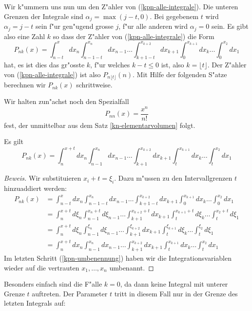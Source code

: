 Wir k"ummern uns nun um den Z"ahler von (\ref{kpn-alle-integrale}).
Die unteren Grenzen der
Integrale sind $\alpha_j=\max(j-t,0)$. Bei gegebenem $t$ wird $\alpha_j=j-t$
sein f"ur gen"ugend grosse $j$, f"ur alle anderen wird $\alpha_j=0$ sein.
Es gibt also eine Zahl $k$ so dass der Z"ahler von (\ref{kpn-alle-integrale})
die Form
\[
P_{nk}(x)
=
\int_{n-t}^xdx_n\int_{n-1-t}^{x_n}dx_{n-1}\dots\int_{k+1-t}^{x_{k+2}}dx_{k+1}\int_0^{x_{k+1}}dx_k\dots\int_0^{x_2}dx_1
\]
hat, es ist dies das gr"osste $k$, f"ur welches $k-t\le 0$ ist, also
$k=\lfloor t\rfloor$. Der Z"ahler von (\ref{kpn-alle-integrale})
ist also $P_{n\lfloor t\rfloor}(n)$.
Mit Hilfe der folgenden S"atze berechnen wir $P_{nk}(x)$ schrittweise.

Wir halten zun"achst noch den Spezialfall
\begin{equation}
P_{nn}(x)=\frac{x^n}{n!}
\label{spezialfall-pnn}
\end{equation}
fest, der unmittelbar aus dem Satz \ref{kn-elementarvolumen} folgt.

\begin{satz}
\label{kn-variablentransformation}
Es gilt
\begin{equation}
P_{nk}(x)=\int_{n}^{x+t}dx_n\int_{n-1}^{x_n}dx_{n-1}\dots\int_{k+1}^{x_{k+2}}dx_{k+1}\int_t^{x_{k+1}}dx_k\dots\int_t^{x_2}dx_1
\label{kpn-variablen-transformation}
\end{equation}
\end{satz}
\begin{proof}[Beweis]
Wir substituieren $x_i+t=\xi_i$. Dazu m"ussen zu den Intervallgrenzen
$t$ hinzuaddiert werden:
\begin{align}
P_{nk}(x)
&=
\int_{n-t}^xdx_n\int_{n-1-t}^{x_n}dx_{n-1}\dots\int_{k+1-t}^{x_{k+2}}dx_{k+1}\int_0^{x_{k+1}}dx_k\dots\int_0^{x_2}dx_1
\nonumber\\
&=
\int_{n}^{x+t}d\xi_n\int_{n-1}^{x_n+t}d\xi_{n-1}\dots\int_{k+1}^{x_{k+2}+t}dx_{k+1}\int_t^{x_{k+1}+t}d\xi_k\dots\int_t^{x_2+t}d\xi_1
\nonumber\\
&=
\int_{n}^{x+t}d\xi_n\int_{n-1}^{\xi_n}d\xi_{n-1}\dots\int_{k+1}^{\xi_{k+2}}dx_{k+1}\int_t^{\xi_{k+1}}d\xi_k\dots\int_t^{\xi_2}d\xi_1
\nonumber\\
&=
\int_{n}^{x+t}dx_n\int_{n-1}^{x_n}dx_{n-1}\dots\int_{k+1}^{x_{k+2}}dx_{k+1}\int_t^{x_{k+1}}dx_k\dots\int_t^{x_2}dx_1
\label{kpn-umbenennung}
\end{align}
Im letzten Schritt (\ref{kpn-umbenennung}) haben wir die Integrationsvariablen
wieder auf die vertrauten $x_1,\dots,x_n$ umbenannt.
\end{proof}
Besonders einfach sind die F"alle $k=0$, da dann keine Integral mit
unterer Grenze $t$ auftreten. Der Parameter $t$ tritt in diesem Fall nur
in der Grenze des letzten Integrals auf:

